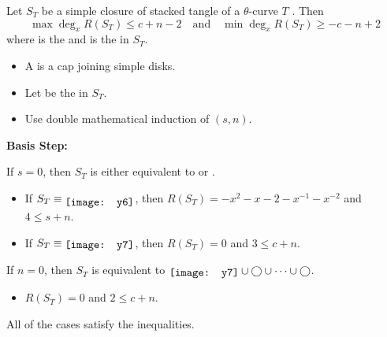 \begin{frame}
	\begin{prop}
		Let $S_T$ be a simple closure of stacked tangle of a $\theta$-curve $T$ .
		Then
		\[
			\max\deg_xR(S_T) \le c + n -2 \quad\text{and}\quad \min\deg_xR(S_T) \ge -c -n +2
		\]
		where  is the  and  is the  in $S_T$.
	\end{prop}

	\mypf
	\begin{itemize}
		\item A  is a cap joining simple disks.
		\item Let  be the  in $S_T$.
		\item Use double mathematical induction of $(s,n)$.
	\end{itemize}
\end{frame}


\begin{frame}
	\textbf{Basis Step:}

		If $s=0$, then $S_T$ is either equivalent to \raisebox{-3pt}{\texttt{[image: y6]}} or \raisebox{-1.5pt}{\texttt{[image: y7]}}.
		\begin{itemize}
			\item If $S_T\equiv \raisebox{-3pt}{\texttt{[image: y6]}}$, then $R(S_T)=-x^2 - x -2 - x^{-1} - x^{-2}$ and $4\le s+n$.
			\item If $S_T\equiv \raisebox{-1.5pt}{\texttt{[image: y7]}}$, then $R(S_T)=0$ and $3\le c+n$.
		\end{itemize}
		If $n=0$, then $S_T$ is equivalent to $\raisebox{-1.5pt}{\texttt{[image: y7]}}\cup\bigcirc\cup\cdots\cup\bigcirc$.
		\begin{itemize}
			\item $R(S_T)=0$ and $2\le c+n$.
		\end{itemize}
	All of the cases satisfy the inequalities.

\end{frame}


